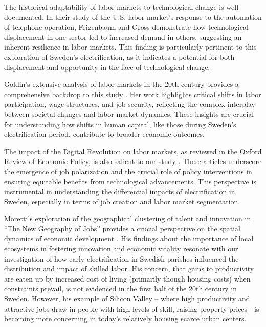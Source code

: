 \documentclass[
]{article}
\begin{document}
The historical adaptability of labor markets to technological change is
well-documented. In their study of the U.S. labor market's response to
the automation of telephone operation, Feigenbaum and Gross
\textcite{Feigenbaum2020} demonstrate how technological displacement in
one sector led to increased demand in others, suggesting an inherent
resilience in labor markets. This finding is particularly pertinent to
this exploration of Sweden's electrification, as it indicates a
potential for both displacement and opportunity in the face of
technological change.

Goldin's extensive analysis of labor markets in the 20th century
provides a comprehensive backdrop to this study
\autocite*{Goldin1994,Goldin1998}. Her work highlights critical shifts
in labor participation, wage structures, and job security, reflecting
the complex interplay between societal changes and labor market
dynamics. These insights are crucial for understanding how shifts in
human capital, like those during Sweden's electrification period,
contribute to broader economic outcomes.

The impact of the Digital Revolution on labor markets, as reviewed in
the Oxford Review of Economic Policy, is also salient to our study
\autocite{Adams2018,Goos2018}. These articles underscore the emergence
of job polarization and the crucial role of policy interventions in
ensuring equitable benefits from technological advancements. This
perspective is instrumental in understanding the differential impacts of
electrification in Sweden, especially in terms of job creation and labor
market segmentation.

Moretti's exploration of the geographical clustering of talent and
innovation in ``The New Geography of Jobs'' provides a crucial
perspective on the spatial dynamics of economic development
\autocite{Moretti2012}. His findings about the importance of local
ecosystems in fostering innovation and economic vitality resonate with
our investigation of how early electrification in Swedish parishes
influenced the distribution and impact of skilled labor. His concern,
that gains to productivity are eaten up by increased cost of living
(primarily though housing costs) when constraints prevail, is not
evidenced in the first half of the 20th century in Sweden. However, his
example of Silicon Valley -- where high productivity and attractive jobs
draw in people with high levels of skill, raising property prices - is
becoming more concerning in today's relatively housing scarce urban
centers.
\end{document}
